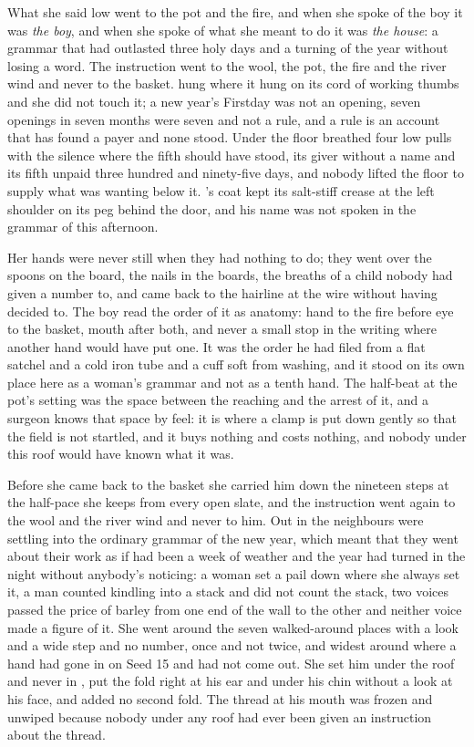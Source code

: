 What she said low went to the pot and the fire, and when she spoke of the boy it was \emph{the boy}, and when she spoke of what she meant to do it was \emph{the house}: a grammar that had outlasted three holy days and a turning of the year without losing a word. The instruction went to the wool, the pot, the fire and the river wind and never to the basket.  hung where it hung on its cord of working thumbs and she did not touch it; a new year's Firstday was not an opening, seven openings in seven months were seven and not a rule, and a rule is an account that has found a payer and none stood. Under the floor  breathed four low pulls with the silence where the fifth should have stood, its giver without a name and its fifth unpaid three hundred and ninety-five days, and nobody lifted the floor to supply what was wanting below it. 's coat kept its salt-stiff crease at the left shoulder on its peg behind the door, and his name was not spoken in the grammar of this afternoon.

Her hands were never still when they had nothing to do; they went over the spoons on the board, the nails in the boards, the breaths of a child nobody had given a number to, and came back to the hairline at the wire without having decided to. The boy read the order of it as anatomy: hand to the fire before eye to the basket, mouth after both, and never a small stop in the writing where another hand would have put one. It was the order he had filed from a flat satchel and a cold iron tube and a cuff soft from washing, and it stood on its own place here as a woman's grammar and not as a tenth hand. The half-beat at the pot's setting was the space between the reaching and the arrest of it, and a surgeon knows that space by feel: it is where a clamp is put down gently so that the field is not startled, and it buys nothing and costs nothing, and nobody under this roof would have known what it was.

Before she came back to the basket she carried him down the nineteen steps at the half-pace she keeps from every open slate, and the instruction went again to the wool and the river wind and never to him. Out in  the neighbours were settling into the ordinary grammar of the new year, which meant that they went about their work as if  had been a week of weather and the year had turned in the night without anybody's noticing: a woman set a pail down where she always set it, a man counted kindling into a stack and did not count the stack, two voices passed the price of barley from one end of the wall to the other and neither voice made a figure of it. She went around the seven walked-around places with a look and a wide step and no number, once and not twice, and widest around  where a hand had gone in on Seed 15 and had not come out. She set him under the roof and never in , put the fold right at his ear and under his chin without a look at his face, and added no second fold. The thread at his mouth was frozen and unwiped because nobody under any roof had ever been given an instruction about the thread.

